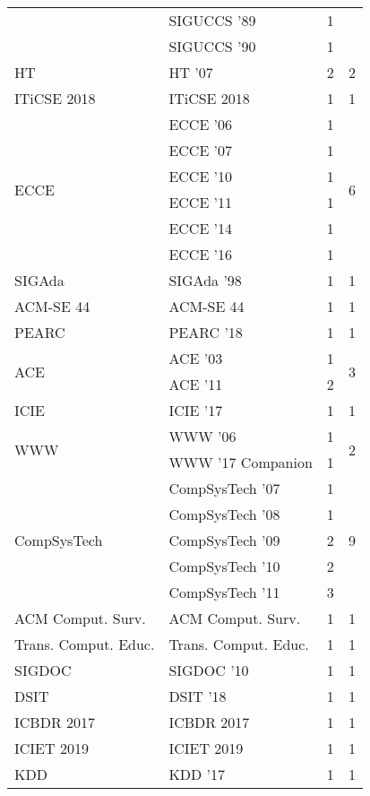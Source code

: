 \begin{table*}[t]
\begin{tabular}{llrr}
& SIGUCCS '89 & 1 &\\
& SIGUCCS '90 & 1 &\\
\multirow{1}{*}{HT } & HT '07 & 2 & \multirow{1}{*}{2}\\
\multirow{1}{*}{ITiCSE 2018} & ITiCSE 2018 & 1 & \multirow{1}{*}{1}\\
\multirow{6}{*}{ECCE } & ECCE '06 & 1 & \multirow{6}{*}{6}\\
& ECCE '07 & 1 &\\
& ECCE '10 & 1 &\\
& ECCE '11 & 1 &\\
& ECCE '14 & 1 &\\
& ECCE '16 & 1 &\\
\multirow{1}{*}{SIGAda } & SIGAda '98 & 1 & \multirow{1}{*}{1}\\
\multirow{1}{*}{ACM-SE 44} & ACM-SE 44 & 1 & \multirow{1}{*}{1}\\
\multirow{1}{*}{PEARC } & PEARC '18 & 1 & \multirow{1}{*}{1}\\
\multirow{2}{*}{ACE } & ACE '03 & 1 & \multirow{2}{*}{3}\\
& ACE '11 & 2 &\\
\multirow{1}{*}{ICIE } & ICIE '17 & 1 & \multirow{1}{*}{1}\\
\multirow{2}{*}{WWW } & WWW '06 & 1 & \multirow{2}{*}{2}\\
& WWW '17 Companion & 1 &\\
\multirow{5}{*}{CompSysTech } & CompSysTech '07 & 1 & \multirow{5}{*}{9}\\
& CompSysTech '08 & 1 &\\
& CompSysTech '09 & 2 &\\
& CompSysTech '10 & 2 &\\
& CompSysTech '11 & 3 &\\
\multirow{1}{*}{ACM Comput. Surv.} & ACM Comput. Surv. & 1 & \multirow{1}{*}{1}\\
\multirow{1}{*}{Trans. Comput. Educ.} & Trans. Comput. Educ. & 1 & \multirow{1}{*}{1}\\
\multirow{1}{*}{SIGDOC } & SIGDOC '10 & 1 & \multirow{1}{*}{1}\\
\multirow{1}{*}{DSIT } & DSIT '18 & 1 & \multirow{1}{*}{1}\\
\multirow{1}{*}{ICBDR 2017} & ICBDR 2017 & 1 & \multirow{1}{*}{1}\\
\multirow{1}{*}{ICIET 2019} & ICIET 2019 & 1 & \multirow{1}{*}{1}\\
\multirow{1}{*}{KDD } & KDD '17 & 1 & \multirow{1}{*}{1}\\

\end{tabular}
\end{table*}
